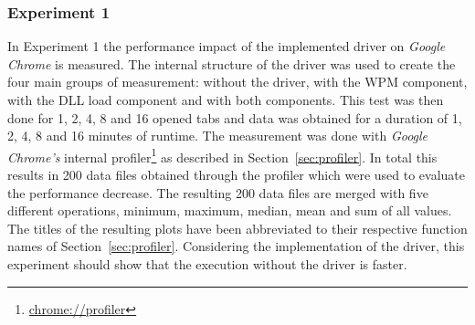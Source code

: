 \subsubsection{Experiment 1}
In Experiment 1 the performance impact of the implemented driver on \emph{Google Chrome} is measured. The internal structure of the driver was used to create the four main groups of measurement: without the driver, with the \gls{WPM} component, with the \gls{DLL} load component and with both components. This test was then done for 1, 2, 4, 8 and 16 opened tabs and data was obtained for a duration of 1, 2, 4, 8 and 16 minutes of runtime. The measurement was done with \emph{Google Chrome's} internal profiler\footnote{\url{chrome://profiler}} as described in Section~\ref{sec:profiler}. In total this results in 200 data files obtained through the profiler which were used to evaluate the performance decrease. The resulting 200 data files are merged with five different operations, minimum, maximum, median, mean and sum of all values. The titles of the resulting plots have been abbreviated to their respective function names of Section~\ref{sec:profiler}. Considering the implementation of the driver, this experiment should show that the execution without the driver is faster.
